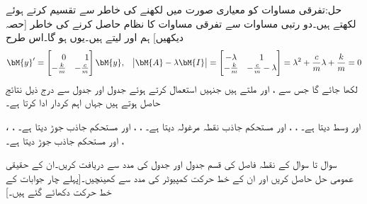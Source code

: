 حل:تفرقی مساوات کو معیاری صورت میں لکھنے کی خاطر  سے تقسیم کرتے  ہوئے  لکھتے ہیں۔دو رتبی مساوات سے تفرقی مساوات کا نظام حاصل کرنے کی خاطر [حصہ  دیکھیں] ہم  اور  لیتے ہیں۔یوں 
 ہو گا۔اس طرح
\begin{align*}
\bM{y}'=\begin{bmatrix*}[r] 0&1\\-\frac{k}{m}&-\frac{c}{m}  \end{bmatrix*} \bM{y},\quad  \abs{\bM{A}-\lambda\bM{I}}=\begin{bmatrix} -\lambda&1\\-\frac{k}{m}&-\frac{c}{m}-\lambda \end{bmatrix}=\lambda^2+\frac{c}{m}\lambda+\frac{k}{m}=0
\end{align*}
لکھا جائے گا جس سے ،  اور  ملتے ہیں جنہیں استعمال کرتے ہوئے جدول  اور جدول  سے درج ذیل نتائج حاصل ہوتے ہیں جہاں  اہم کردار ادا کرتا ہے۔
\begin{itemize}
 ،  اور   وسط دیتا ہے۔
  ، ،  اور  مستحکم جاذب نقطہ مرغولہ دیتا ہے۔
 ، ،  اور   مستحکم جاذب جوڑ دیتا ہے۔
 ، ،  اور  مستحکم جاذب جوڑ دیتا ہے۔
\end{itemize}

سوال  تا سوال  کے نقطہ فاصل کی قسم جدول  اور جدول  کی مدد سے  دریافت کریں۔ان کے حقیقی عمومی حل حاصل کریں اور ان کے خط حرکت کمپیوٹر کی مدد سے کھینچیں۔[پہلے چار جوابات کے خط حرکت دکھائے گئے ہیں۔]

